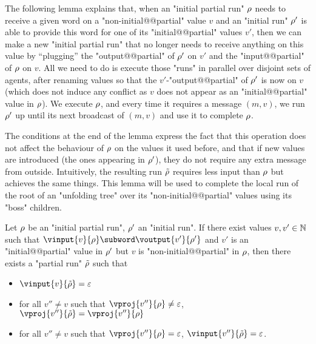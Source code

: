 The following lemma explains that, when an "initial partial run" $\rho$ needs to receive a given word on a "non-initial@@partial" value $v$ and an "initial run" $\rho'$ is able to provide this word for one of its "initial@@partial" values $v'$, then we can make a new "initial partial run" that no longer needs to receive anything on this value by ``plugging'' the "output@@partial" of $\rho'$ on $v'$ and the "input@@partial" of $\rho$ on $v$. All we need to do is execute those "runs" in parallel over disjoint sets of agents, after renaming values so that the $v'$-"output@@partial" of $\rho'$ is now on $v$ (which does not induce any conflict as $v$ does not appear as an "initial@@partial" value in $\rho$). We execute $\rho$, and every time it requires a message $(m,v)$, we run $\rho'$ up until its next broadcast of $(m,v)$ and use it to complete $\rho$.

The conditions at the end of the lemma express the fact that this operation does not affect the behaviour of $\rho$ on the values it used before, and that if new values are introduced (the ones appearing in $\rho'$), they do not require any extra message from outside. Intuitively, the resulting run $\Tilde{\rho}$ requires less input than $\rho$ but achieves the same things. This lemma will be used to complete the local run of the root of an "unfolding tree" over its "non-initial@@partial" values using its "boss" children. 

\begin{lemma}
	\label{lem:boss-composition}
	Let $\rho$ be an "initial partial run", $\rho'$ an "initial run".
	If there exist values $v, v' \in \mathbb{N}$ such that $\vinput{v}{\run} \subword \voutput{v'}{\run'}$ and $v'$ is an "initial@@partial" value in $\rho'$ but $v$ is "non-initial@@partial" in $\rho$, then there exists a "partial run" $\Tilde{\rho}$ such that 
	\begin{itemize}
		\item $\vinput{v}{\Tilde{\run}} = \varepsilon$ 
		
		\item for all $v'' \neq v$ such that $\vproj{v''}{\run} \neq \varepsilon$, $\vproj{v''}{\Tilde{\run}} = \vproj{v''}{\run}$
		
		\item for all $v'' \neq v$ such that $\vproj{v''}{\run} = \varepsilon$, $\vinput{v''}{\Tilde{\run}} = \varepsilon$.
	\end{itemize}
\end{lemma}

